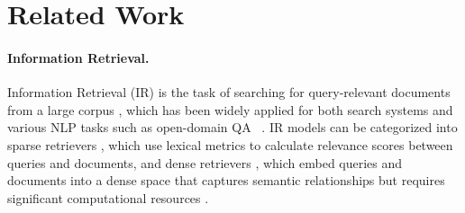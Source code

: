 \section{Related Work}






\paragraph{Information Retrieval.}
Information Retrieval (IR) is the task of searching for query-relevant documents from a large corpus \cite{IR}, which has been widely applied for both search systems and various NLP tasks such as open-domain QA ~\cite{KILT}.
IR models can be categorized into sparse retrievers \cite{tfidf, bm25}, which use lexical metrics to calculate relevance scores between queries and documents, and dense retrievers \cite{DPR-karpukhin, contriever}, which embed queries and documents into a dense space that captures semantic relationships but requires significant computational resources \cite{dar}.
 

